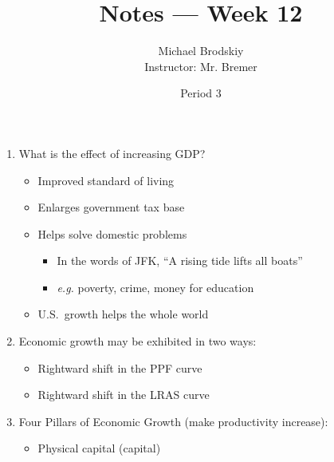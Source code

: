 \documentclass[12pt]{article}
\title{Notes — Week 12}
\date{Period 3}
\author{Michael Brodskiy\\ \small Instructor: Mr. Bremer}
\begin{document}
\maketitle

\begin{enumerate}

  \item What is the effect of increasing GDP?

    \begin{itemize}

      \item Improved standard of living

      \item Enlarges government tax base

      \item Helps solve domestic problems

        \begin{itemize}

          \item In the words of JFK, “A rising tide lifts all boats”

          \item \textit{e.g.} poverty, crime, money for education

        \end{itemize}

      \item U.S.\ growth helps the whole world

    \end{itemize}

  \item Economic growth may be exhibited in two ways:

    \begin{itemize}

      \item Rightward shift in the PPF curve

      \item Rightward shift in the LRAS curve

    \end{itemize}

  \item Four Pillars of Economic Growth (make productivity increase):

    \begin{itemize}

      \item Physical capital (capital)

        \begin{itemize}


\end{itemize}
\end{itemize}
\end{enumerate}
\end{document}
